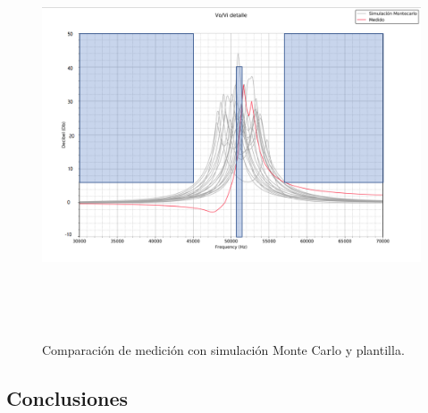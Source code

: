  \begin{figure}[H] %
	\centering	\includegraphics[width=12cm,height=12cm,keepaspectratio]{../EJ4/graficos/plantilla.png}
	\caption{Comparaci\'on de medici\'on con simulaci\'on Monte Carlo y plantilla.}
	\label{plantilla}
\end{figure}


\subsection{Conclusiones} 



